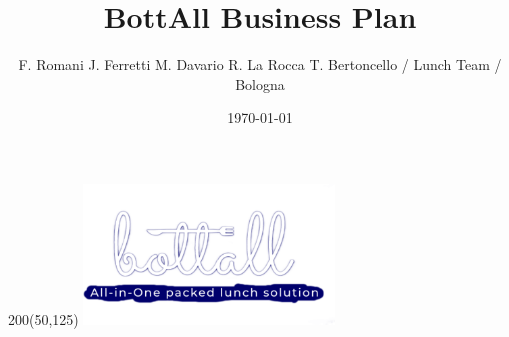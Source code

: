 \documentclass[12pt]{article}
\title{BottAll Business Plan}
\author{F. Romani \newline J. Ferretti \newline M. Davario \newline R. La Rocca \newline T. Bertoncello \newline / Lunch Team / Bologna}
\date{\today}
\begin{document}
   \begin{textblock}{200}(50,125)
		\includegraphics[width=0.5\textwidth]{images/image.png}
    \end{textblock}

\maketitle


\tableofcontents
\clearpage

















\end{document}

